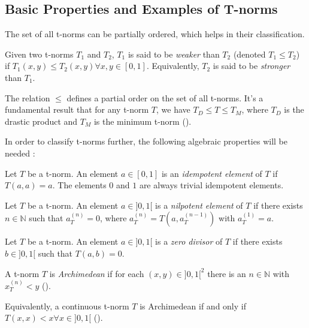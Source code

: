 \subsection{Basic Properties and Examples of T-norms}
The set of all t-norms can be partially ordered, which helps in their classification.
\begin{definition}
  Given two t-norms $T_1$ and $T_2$, $T_1$ is said to be \emph{weaker} than $T_2$ (denoted $T_1 \leq T_2$) if $T_1(x,y) \leq T_2(x,y) \forall x,y \in [0,1]$.
  Equivalently, $T_2$ is said to be \emph{stronger} than $T_1$.
\end{definition}
\begin{remark}
  The relation $\leq$ defines a partial order on the set of all t-norms. It's a fundamental result that for any t-norm $T$, we have $T_D \leq T \leq T_M$, where $T_D$ is the drastic product and $T_M$ is the minimum t-norm (\cite[Rem.~1.5]{Klement2000}).
\end{remark}
In order to classify t-norms further, the following algebraic properties will be needed \cite[Def.~2.1]{Klement2000}:
\begin{definition}
Let $T$ be a t-norm. An element $a \in [0,1]$ is an \emph{idempotent element} of $T$ if $T(a,a)=a$. The elements $0$ and $1$ are always trivial idempotent elements.
\end{definition}

\begin{definition}
Let $T$ be a t-norm. An element $a \in ]0,1[$ is a \emph{nilpotent element} of $T$ if there exists $n \in \mathbb{N}$ such that $a_T^{(n)} = 0$, where $a_T^{(n)} = T(a, a_T^{(n-1)})$ with $a_T^{(1)}=a$.
\end{definition}

\begin{definition}
Let $T$ be a t-norm. An element $a \in ]0,1[$ is a \emph{zero divisor} of $T$ if there exists $b \in ]0,1[$ such that $T(a,b)=0$.
\end{definition}

\begin{definition}
A t-norm $T$ is \emph{Archimedean} if for each $(x,y) \in ]0,1[^2$ there is an $n \in \mathbb{N}$ with $x_T^{(n)} < y$ (\cite[Def.~2.9]{Klement2000}). 

Equivalently, a continuous t-norm $T$ is Archimedean if and only if $T(x,x) < x \forall x \in ]0,1[$ (\cite[Thm.~2.12]{Klement2000}). 
\end{definition}


